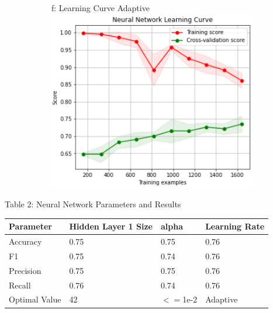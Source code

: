 \documentclass{article}
\begin{document}
\begin{figure}
\begin{subfigure}{.38\textwidth}
	\end{subfigure}
	\begin{subfigure}{.38\textwidth}
		\centering
		f: Learning Curve Adaptive\\
		\includegraphics[width=\linewidth]{poland_nn_learning_curve_adaptive.png}
		
	\end{subfigure}

	\label{fig:test}
\end{figure}


\begin{table}
	
	\centering
	Table 2: Neural Network Parameters and Results\\
	\begin{tabular}{ l l l l }
		\hline
		Parameter & Hidden Layer 1 Size& alpha & Learning Rate \\
		\hline
		Accuracy & 0.75 & 0.75 & 0.76 \\
		F1 & 0.75 & 0.74 &0.76 \\
		Precision & 0.75 & 0.75 & 0.76 \\
		Recall & 0.76 & 0.74 & 0.76\\
		Optimal Value & 42 & $<=$1e-2  & Adaptive \\
		
		
		\hline 
	\end{tabular}
\end{table}
\end{document}
